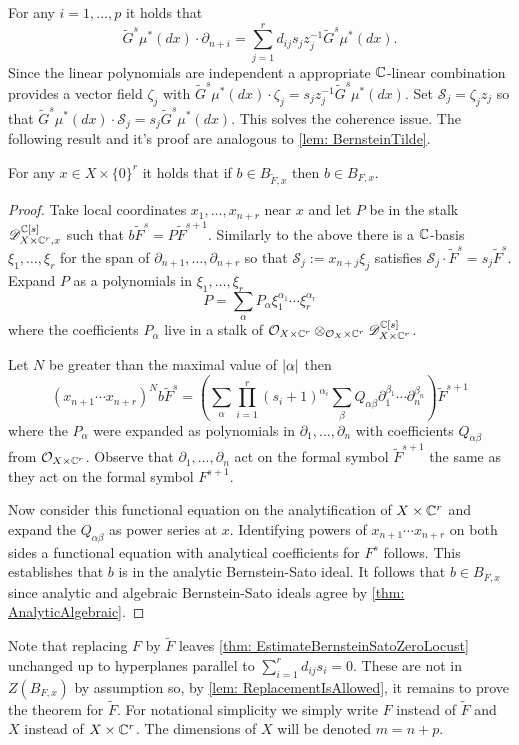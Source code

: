 For any $i=1,\ldots,p$ it holds that
$$\widetilde{G}^s \mu^*(dx)\cdot \partial_{n+i} = \sum_{j=1}^r d_{ij}s_j z_j^{-1} \widetilde{G}^s \mu^*(dx).$$
Since the linear polynomials are independent a appropriate $\mathbb{C}$-linear combination provides a vector field $\zeta_j$ with $\widetilde{G}^s \mu^*(dx)\cdot \zeta_j = s_{j}z_j^{-1}\widetilde{G}^s \mu^*(dx)$.
Set $\mathcal{S}_j = \zeta_jz_j$ so that $\widetilde{G}^s \mu^*(dx) \cdot \mathcal{S}_j = s_j \widetilde{G}^s \mu^*(dx) $.
This solves the coherence issue.
The following result and it's proof are analogous to \cref{lem: BernsteinTilde}.
\begin{lemma}\label{lem: ReplacementIsAllowed}
  For any $x\in X\times \{0\}^r$ it holds that if $b\in B_{\widetilde{F},x}$ then $b \in B_{F,x}$.
\end{lemma}
\begin{proof}
  Take local coordinates $x_1,\ldots, x_{n+r}$ near $x$ and let $P$ be in the stalk $\mathscr{D}_{X\times \mathbb{C}^r,x}^{\mathbb{C}[s]}$ such that $b \widetilde{F}^s = P \widetilde{F}^{s+1}$.
  Similarly to the above there is a $\mathbb{C}$-basis $\xi_1,\ldots,\xi_r$ for the span of $\partial_{n+1}, \ldots, \partial_{n+r}$ so that $\mathcal{S}_j := x_{n+j}\xi_j$ satisfies $\mathcal{S}_j \cdot \widetilde{F}^s = s_{j}\widetilde{F}^s$.
  Expand $P$ as a polynomials in $\xi_1,\ldots,\xi_r$
  $$P = \sum_{\alpha} P_\alpha \xi_{1}^{\alpha_1}\cdots \xi_{r}^{\alpha_r}$$
  where the coefficients $P_\alpha$ live in a stalk of $\mathcal{O}_{X\times \mathbb{C}^r}\otimes_{\mathcal{O}_X\times \mathbb{C}^r}\mathscr{D}_{X\times \mathbb{C}^r}^{\mathbb{C}[s]}$.

  Let $N$ be greater than the maximal value of $\vert \alpha \vert$ then
  $$(x_{n+1}\cdots x_{n+r})^N b \widetilde{F}^s = \left(\sum_{\alpha} \prod_{i=1}^r (s_i + 1)^{\alpha_i} \sum_\beta Q_{\alpha\beta} \partial_1^{\beta_1}\cdots \partial_n^{\beta_n} \right)\widetilde{F}^{s+1}$$
  where the $P_\alpha$ were expanded as polynomials in $\partial_1,\ldots,\partial_n$ with coefficients $Q_{\alpha\beta}$ from $\mathcal{O}_{X\times \mathbb{C}^r}$.
  Observe that $\partial_1,\ldots, \partial_n$ act on the formal symbol $\widetilde{F}^{s+1}$ the same as they act on the formal symbol $F^{s+1}$.

  Now consider this functional equation on the analytification of $X\times \mathbb{C}^r$ and expand the $Q_{\alpha\beta}$ as power series at $x$.
  Identifying powers of $x_{n+1}\cdots x_{n+r}$ on both sides a functional equation with analytical coefficients for $F^s$ follows.
  This establishes that $b$ is in the analytic Bernstein-Sato ideal.
  It follows that $ b\in B_{F,x}$ since analytic and algebraic Bernstein-Sato ideals agree by \cref{thm: AnalyticAlgebraic}.
\end{proof}
Note that replacing $F$ by $\widetilde{F}$ leaves \cref{thm: EstimateBernsteinSatoZeroLocust} unchanged up to hyperplanes parallel to $\sum_{i=1}^r d_{ij}s_i = 0$.
These are not in $Z(B_{F,x})$ by assumption so, by \cref{lem: ReplacementIsAllowed}, it remains to prove the theorem for $\widetilde{F}$.
For notational simplicity we simply write $F$ instead of $\widetilde{F}$ and $X$ instead of $X\times \mathbb{C}^r$.
The dimensions of $X$ will be denoted $m = n+p$.

